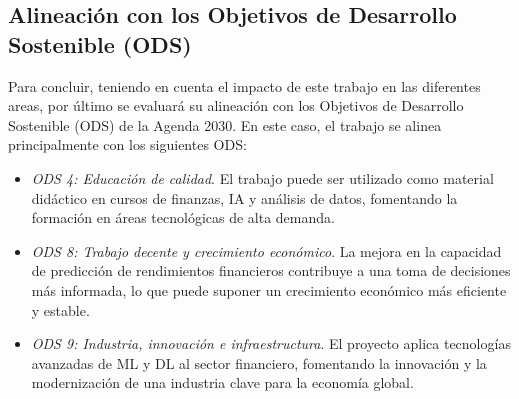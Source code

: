 \subsection{Alineación con los Objetivos de Desarrollo Sostenible (ODS)}
Para concluir, teniendo en cuenta el impacto de este trabajo en las diferentes areas, por último se evaluará su alineación con los Objetivos de Desarrollo Sostenible (ODS) de la Agenda 2030. En este caso, el trabajo se alinea principalmente con los siguientes ODS:

\begin{itemize}
    \item \emph{ODS 4: Educación de calidad}. El trabajo puede ser utilizado como material didáctico en cursos de finanzas, IA y análisis de datos, fomentando la formación en áreas tecnológicas de alta demanda.
    \item \emph{ODS 8: Trabajo decente y crecimiento económico}. La mejora en la capacidad de predicción de rendimientos financieros contribuye a una toma de decisiones más informada, lo que puede suponer un crecimiento económico más eficiente y estable.
    \item \emph{ODS 9: Industria, innovación e infraestructura}. El proyecto aplica tecnologías avanzadas de ML y DL al sector financiero, fomentando la innovación y la modernización de una industria clave para la economía global.
\end{itemize}